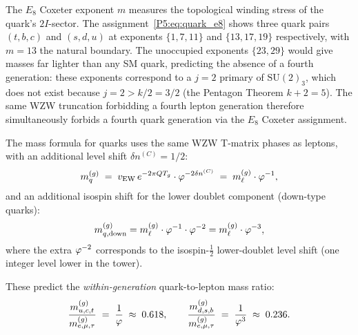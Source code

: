 \begin{remark}
\label{P5:rem:other_quarks}
The $E_8$ Coxeter exponent $m$ measures the topological winding stress
of the quark's $2I$-sector. The assignment~\eqref{P5:eq:quark_e8} shows
three quark pairs $(t,b,c)$ and $(s,d,u)$ at exponents $\{1,7,11\}$ and
$\{13,17,19\}$ respectively, with $m=13$ the natural boundary. The
unoccupied exponents $\{23,29\}$ would give masses far lighter than any
SM quark, predicting the absence of a fourth generation: these
exponents correspond to a $j=2$ primary of $\mathrm{SU}(2)_3$, which
does not exist because $j=2>k/2=3/2$ (the Pentagon Theorem $k+2=5$).
The same WZW truncation forbidding a fourth lepton generation therefore
simultaneously forbids a fourth quark generation via the $E_8$ Coxeter
assignment.
\end{remark}

The mass formula for quarks uses the same WZW T-matrix phases as leptons,
with an additional level shift $\delta n^{(C)}=1/2$:
\begin{equation}
  m_q^{(g)} \;=\; v_{\mathrm{EW}}\,e^{-2\pi Q T_g}\cdot\varphi^{-2\delta n^{(C)}}
              \;=\; m_\ell^{(g)}\cdot\varphi^{-1},
  \label{P5:eq:quark_mass_formula}
\end{equation}
and an additional isospin shift for the lower doublet component
(down-type quarks):
\begin{equation}
  m_{q,\mathrm{down}}^{(g)}
  = m_\ell^{(g)}\cdot\varphi^{-1}\cdot\varphi^{-2}
  = m_\ell^{(g)}\cdot\varphi^{-3},
  \label{P5:eq:down_quark_mass}
\end{equation}
where the extra $\varphi^{-2}$ corresponds to the isospin-$\tfrac{1}{2}$
lower-doublet level shift (one integer level lower in the tower).

These predict the \emph{within-generation} quark-to-lepton mass ratio:
\begin{equation}
  \frac{m_{u,c,t}^{(g)}}{m_{e,\mu,\tau}^{(g)}}
  \;=\; \frac{1}{\varphi}
  \;\approx\; 0.618,
  \qquad
  \frac{m_{d,s,b}^{(g)}}{m_{e,\mu,\tau}^{(g)}}
  \;=\; \frac{1}{\varphi^3}
  \;\approx\; 0.236.
  \label{P5:eq:quark_lepton_ratio}
\end{equation}

